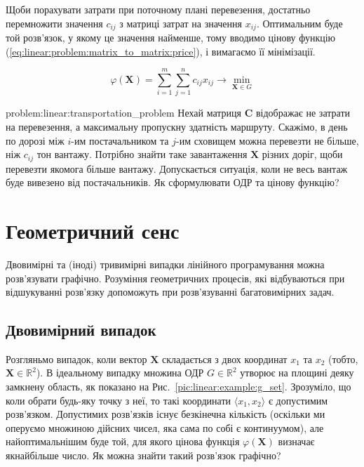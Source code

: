 \documentclass[\main/book.tex]{subfiles}
\begin{document}
Щоби порахувати затрати при поточному плані перевезення, достатньо перемножити значення $c_{ij}$ з матриці затрат на значення $x_{ij}$. Оптимальним буде той розв'язок, у якому це значення найменше, тому вводимо цінову функцію (\ref{eq:linear:problem:matrix_to_matrix:price}), і вимагаємо її мінімізації.

\begin{equation}
 \varphi(\mathbf{X}) =
 \sum_{i=1}^m \sum_{j=1}^n
 c_{ij} x_{ij}
 \rightarrow \min_{\mathbf{X} \in G}
 \label{eq:linear:problem:matrix_to_matrix:price}
\end{equation}

\begin{problem}{problem:linear:transportation_problem}
 Нехай матриця $\mathbf{C}$ відображає не затрати на перевезення, а максимальну пропускну здатність маршруту. Скажімо, в день по дорозі між $i$-им постачальником та $j$-им сховищем можна перевезти не більше, ніж $c_{ij}$ тон вантажу. Потрібно знайти таке завантаження $\mathbf{X}$ різних доріг, щоби перевезти якомога більше вантажу. Допускається ситуація, коли не весь вантаж буде вивезено від постачальників. Як сформулювати ОДР та цінову функцію?
\end{problem}

\section{Геометричний сенс}
\label{section:linear:geometrical}

Двовимірні та (іноді) тривимірні випадки лінійного програмування можна розв'язувати графічно. Розуміння геометричних процесів, які відбуваються при відшукуванні розв'язку допоможуть при розв'язуванні багатовимірних задач.

\subsection{Двовимірний випадок}

Розгляньмо випадок, коли вектор $\mathbf{X}$ складається з двох координат $x_1$ та $x_2$ (тобто, ${\mathbf{X} \in \mathbb{R}^2}$). В ідеальному випадку множина ОДР ${G \in \mathbb{R}^2}$ утворює на площині деяку замкнену область, як показано на Рис.~\ref{pic:linear:example:g_set}. Зрозуміло, що коли обрати будь-яку точку з неї, то такі координати ${\langle x_1, x_2 \rangle}$ є допустимим розв'язком. Допустимих розв'язків існує безкінечна кількість (оскільки ми оперуємо множиною дійсних чисел, яка сама по собі є континуумом), але найоптимальнішим буде той, для якого цінова функція $\varphi(\mathbf{X})$ визначає якнайбільше число. Як можна знайти такий розв'язок графічно?
\end{document}
